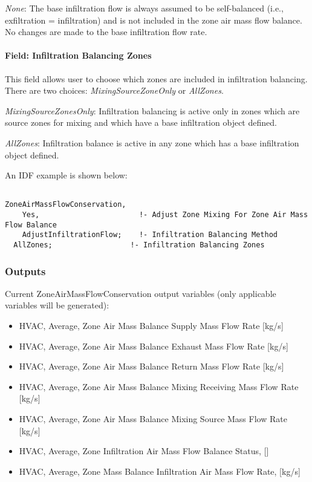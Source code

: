 \emph{None}: The base infiltration flow is always assumed to be self-balanced (i.e., exfiltration = infiltration) and is not included in the zone air mass flow balance. No changes are made to the base infiltration flow rate.

\paragraph{Field: Infiltration Balancing Zones}\label{field-infiltration-balancing-zones}

This field allows user to choose which zones are included in infiltration balancing. There are two choices: \emph{MixingSourceZoneOnly} or \emph{AllZones}.

\emph{MixingSourceZonesOnly}: Infiltration balancing is active only in zones which are source zones for mixing and which have a base infiltration object defined.

\emph{AllZones}: Infiltration balance is active in any zone which has a base infiltration object defined.

An IDF example is shown below:

\begin{lstlisting}

ZoneAirMassFlowConservation,
    Yes,                       !- Adjust Zone Mixing For Zone Air Mass Flow Balance
    AdjustInfiltrationFlow;    !- Infiltration Balancing Method
  AllZones;                  !- Infiltration Balancing Zones
\end{lstlisting}

\subsubsection{Outputs}\label{outputs-7-000}

Current ZoneAirMassFlowConservation output variables (only applicable variables will be generated):

\begin{itemize}
\item
  HVAC, Average, Zone Air Mass Balance Supply Mass Flow Rate {[}kg/s{]}
\item
  HVAC, Average, Zone Air Mass Balance Exhaust Mass Flow Rate {[}kg/s{]}
\item
  HVAC, Average, Zone Air Mass Balance Return Mass Flow Rate {[}kg/s{]}
\item
  HVAC, Average, Zone Air Mass Balance Mixing Receiving Mass Flow Rate {[}kg/s{]}
\item
  HVAC, Average, Zone Air Mass Balance Mixing Source Mass Flow Rate {[}kg/s{]}
\item
  HVAC, Average, Zone Infiltration Air Mass Flow Balance Status, {[]}
\item
  HVAC, Average, Zone Mass Balance Infiltration Air Mass Flow Rate, {[}kg/s{]}
\end{itemize}


